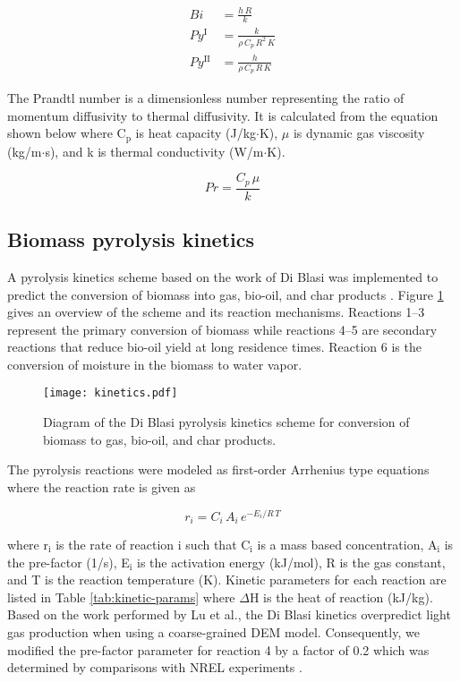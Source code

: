 \begin{align}
    Bi &= \frac{h\,R}{k} \label{eq:biot} \\
    Py^{\textrm{I}} &= \frac{k}{\rho\,C_p\,R^2\,K} \label{eq:pynumber1} \\
    Py^{\textrm{II}} &= \frac{h}{\rho\,C_p\,R\,K} \label{eq:pynumber2}
\end{align}

The Prandtl number is a dimensionless number representing the ratio of momentum diffusivity to thermal diffusivity. It is calculated from the equation shown below where C$_\text{p}$ is heat capacity (J/kg$\cdot$K), $\mu$ is dynamic gas viscosity (kg/m$\cdot$s), and k is thermal conductivity (W/m$\cdot$K).

\begin{equation}
    Pr = \frac{C_p\, \mu}{k}
\end{equation}


\subsection{Biomass pyrolysis kinetics}

A pyrolysis kinetics scheme based on the work of Di Blasi was implemented to predict the conversion of biomass into gas, bio-oil, and char products \cite{Blasi-1993,Blasi-2001}. Figure \ref{fig:blasi} gives an overview of the scheme and its reaction mechanisms. Reactions 1--3 represent the primary conversion of biomass while reactions 4--5 are secondary reactions that reduce bio-oil yield at long residence times. Reaction 6 is the conversion of moisture in the biomass to water vapor.

\begin{figure}[H]
    \centering
    \texttt{[image: kinetics.pdf]}
    \caption{Diagram of the Di Blasi pyrolysis kinetics scheme for conversion of biomass to gas, bio-oil, and char products.}
    \label{fig:blasi}
\end{figure}

\noindent The pyrolysis reactions were modeled as first-order Arrhenius type equations where the reaction rate is given as

\begin{equation}
    r_i = C_i\,A_i\,e^{-E_i / R\,T}
\end{equation}

\noindent where r$_\text{i}$ is the rate of reaction i such that C$_\text{i}$ is a mass based concentration, A$_\text{i}$ is the pre-factor (1/s), E$_\text{i}$ is the activation energy (kJ/mol), R is the gas constant, and T is the reaction temperature (K). Kinetic parameters for each reaction are listed in Table \ref{tab:kinetic-params} where $\Delta$H is the heat of reaction (kJ/kg). Based on the work performed by Lu et al.\cite{lu2020bridging}, the Di Blasi kinetics overpredict light gas production when using a coarse-grained DEM model. Consequently, we modified the pre-factor parameter for reaction 4 by a factor of 0.2 which was determined by comparisons with NREL experiments \cite{French-2021}.

